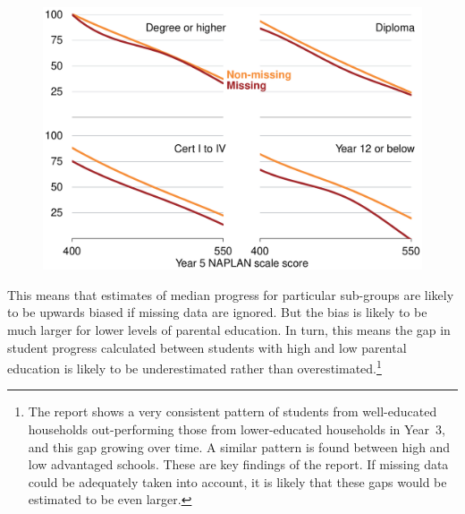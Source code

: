 \begin{figure}[t]
 \includegraphics[width=\columnwidth]{atlas/Missing_gain.pdf}\label{fig:missing_gain}

\end{figure}

This means that estimates of median progress for particular sub-groups are likely to be upwards biased if missing data are ignored. But the bias is likely to be much larger for lower levels of parental education. In turn, this means the gap in student progress calculated between students with high and low parental education is likely to be underestimated rather than overestimated.\footnote{The report shows a very consistent pattern of students from well-educated households out-performing those from lower-educated households in \mbox{Year 3}, and this gap growing over time. A similar pattern is found between high and low advantaged schools. These are key findings of the report. If missing data could be adequately taken into account, it is likely that these gaps would be estimated to be even larger.}

